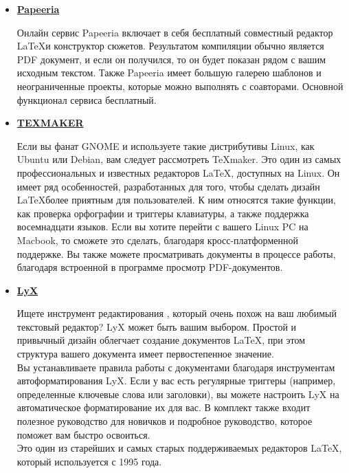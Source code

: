 \documentclass[a4paper,12pt]{article} %
\begin{document}
\begin{itemize}
С ShareLaTeX Вы получаете одинаковые настройки \LaTeX в любом месте. Работая с коллегами или учениками в ShareLaTeX, Вы никогда не столкнетесь с конфликтом версий или пакетов.

Также поддерживается большинство возможностей \LaTeX, включая вставку изображений, библиографии, формулы и многое другое.

\item \large \textbf{\href{https://papeeria.com/}{Papeeria}}

\normalsize Онлайн сервис Papeeria включает в себя бесплатный совместный редактор \LaTeX и конструктор сюжетов. Результатом компиляции обычно является PDF документ, и если он получился, то он будет показан рядом с вашим исходным текстом. Также Papeeria имеет большую галерею шаблонов и неограниченные проекты, которые можно выполнять с соавторами. Основной функционал сервиса бесплатный.

\item \large \textbf{\href{https://www.xm1math.net/texmaker/}{TEXMAKER}}

Если вы фанат GNOME и используете такие дистрибутивы Linux, как Ubuntu или Debian, вам следует рассмотреть TeXmaker. Это один из самых профессиональных и известных редакторов LaTeX, доступных на Linux. Он имеет ряд особенностей, разработанных для того, чтобы сделать дизайн \LaTeX более приятным для пользователей. К ним относятся такие функции, как проверка орфографии и триггеры клавиатуры, а также поддержка восемнадцати языков. Если вы хотите перейти с вашего Linux PC на Macbook, то сможете это сделать, благодаря кросс-платформенной поддержке. Вы также можете просматривать документы в процессе работы, благодаря встроенной в программе просмотр PDF-документов.

\item \large \textbf{\href{https://www.lyx.org/}{LyX}}

\normalsize Ищете инструмент редактирования \LaTex, который очень похож на ваш любимый текстовый редактор? LyX может быть вашим выбором. Простой и привычный дизайн облегчает создание документов LaTeX, при этом структура вашего документа имеет первостепенное значение. \\
Вы устанавливаете правила работы с документами благодаря инструментам автоформатирования LyX. Если у вас есть регулярные триггеры (например, определенные ключевые слова или заголовки), вы можете настроить LyX на автоматическое форматирование их для вас. В комплект также входит полезное руководство для новичков и подробное руководство, которое поможет вам быстро освоиться.\\
Это один из старейших и самых старых поддерживаемых редакторов \LaTeX, который используется с 1995 года.\\


\end{itemize}
\end{document}
